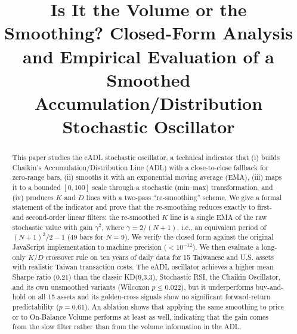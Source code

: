 \documentclass[conference]{IEEEtran}
\begin{document}
\title{Is It the Volume or the Smoothing? Closed-Form Analysis and Empirical Evaluation of a Smoothed Accumulation/Distribution Stochastic Oscillator}

\author{
\and
{}
}

\maketitle

\begin{abstract}
This paper studies the eADL stochastic oscillator, a technical indicator that (i) builds Chaikin's Accumulation/Distribution Line (ADL) with a close-to-close fallback for zero-range bars, (ii) smooths it with an exponential moving average (EMA), (iii) maps it to a bounded $[0,100]$ scale through a stochastic (min--max) transformation, and (iv) produces $K$ and $D$ lines with a two-pass ``re-smoothing'' scheme. We give a formal statement of the indicator and prove that the re-smoothing reduces exactly to first- and second-order linear filters: the re-smoothed $K$ line is a single EMA of the raw stochastic value with gain $\gamma^2$, where $\gamma = 2/(N+1)$, i.e., an equivalent period of $(N+1)^2/2-1$ (49 bars for $N=9$). We verify the closed form against the original JavaScript implementation to machine precision ($<\!10^{-12}$). We then evaluate a long-only $K$/$D$ crossover rule on ten years of daily data for 15 Taiwanese and U.S. assets with realistic Taiwan transaction costs. The eADL oscillator achieves a higher mean Sharpe ratio (0.21) than the classic KD(9,3,3), Stochastic RSI, the Chaikin Oscillator, and its own unsmoothed variants (Wilcoxon $p\le 0.022$), but it underperforms buy-and-hold on all 15 assets and its golden-cross signals show no significant forward-return predictability ($p=0.61$). An ablation shows that applying the same smoothing to price or to On-Balance Volume performs at least as well, indicating that the gain comes from the slow filter rather than from the volume information in the ADL.
\end{abstract}
\end{document}
